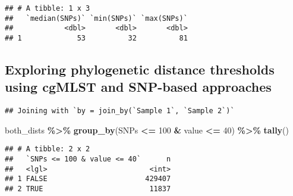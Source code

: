 \documentclass[
]{article}
\newenvironment{Shaded}{\begin{snugshade}}{\end{snugshade}}
\newcommand{\AttributeTok}[1]{\textcolor[rgb]{0.13,0.29,0.53}{#1}}
\newcommand{\CommentTok}[1]{\textcolor[rgb]{0.56,0.35,0.01}{\textit{#1}}}
\newcommand{\DecValTok}[1]{\textcolor[rgb]{0.00,0.00,0.81}{#1}}
\newcommand{\FunctionTok}[1]{\textcolor[rgb]{0.13,0.29,0.53}{\textbf{#1}}}
\newcommand{\NormalTok}[1]{#1}
\newcommand{\OtherTok}[1]{\textcolor[rgb]{0.56,0.35,0.01}{#1}}
\newcommand{\SpecialCharTok}[1]{\textcolor[rgb]{0.81,0.36,0.00}{\textbf{#1}}}
\newcommand{\StringTok}[1]{\textcolor[rgb]{0.31,0.60,0.02}{#1}}
\begin{document}
\begin{verbatim}
## # A tibble: 1 x 3
##   `median(SNPs)` `min(SNPs)` `max(SNPs)`
##            <dbl>       <dbl>       <dbl>
## 1             53          32          81
\end{verbatim}

\hypertarget{exploring-phylogenetic-distance-thresholds-using-cgmlst-and-snp-based-approaches}{%
\subsection{Exploring phylogenetic distance thresholds using cgMLST and
SNP-based
approaches}\label{exploring-phylogenetic-distance-thresholds-using-cgmlst-and-snp-based-approaches}}

\begin{Shaded}
\end{Shaded}

\begin{verbatim}
## Joining with `by = join_by(`Sample 1`, `Sample 2`)`
\end{verbatim}

\begin{Shaded}
\begin{Highlighting}[]
\NormalTok{both\_dists }\SpecialCharTok{\%\textgreater{}\%} \FunctionTok{group\_by}\NormalTok{(SNPs }\SpecialCharTok{\textless{}=} \DecValTok{100} \SpecialCharTok{\&}\NormalTok{ value }\SpecialCharTok{\textless{}=} \DecValTok{40}\NormalTok{) }\SpecialCharTok{\%\textgreater{}\%} \FunctionTok{tally}\NormalTok{()}
\end{Highlighting}
\end{Shaded}

\begin{verbatim}
## # A tibble: 2 x 2
##   `SNPs <= 100 & value <= 40`      n
##   <lgl>                        <int>
## 1 FALSE                       429407
## 2 TRUE                         11837
\end{verbatim}
\end{document}
